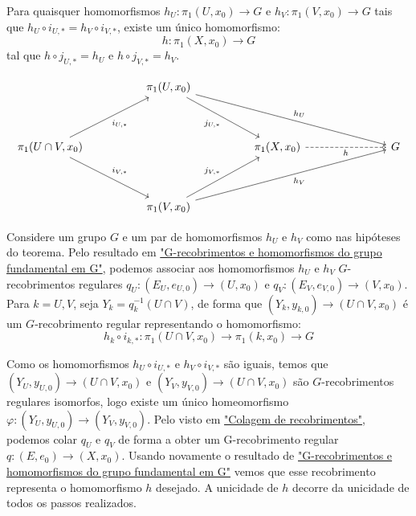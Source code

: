 \begin{thm} 
	Para quaisquer homomorfismos $h_U:\pi_1(U, x_0) \longrightarrow G$ e $h_V:\pi_1(V, x_0) \longrightarrow G$ tais que $h_U \circ i_{U, *} = h_V \circ i_{V, *}$, existe um único homomorfismo: $$h:\pi_1(X, x_0) \longrightarrow G$$ tal que $h \circ j_{U, *} = h_U$ e $h \circ j_{V, *} = h_V$.
\end{thm}

\[\begin{tikzcd}
	&& {\pi_1(U, x_0)} \\
	\\
	{\pi_1(U \cap V, x_0)} &&&& {\pi_1(X, x_0)} &&& G \\
	\\
	&& {\pi_1(V, x_0)}
	\arrow["{j_{U, *}}"', from=1-3, to=3-5]
	\arrow["{h_U}", from=1-3, to=3-8]
	\arrow["{i_{U, *}}"', from=3-1, to=1-3]
	\arrow["{i_{V, *}}", from=3-1, to=5-3]
	\arrow["h"', dashed, from=3-5, to=3-8]
	\arrow["{j_{V, *}}", from=5-3, to=3-5]
	\arrow["{h_V}"', from=5-3, to=3-8]
\end{tikzcd}\]

\begin{dem}
    Considere um grupo $G$ e um par de homomorfismos $h_U$ e $h_V$ como nas hipóteses do teorema. Pelo resultado em \hyperref[homomorfismos-e-g-recobrimentos-prop]{"G-recobrimentos e homomorfismos do grupo fundamental em G"}, podemos associar aos homomorfismos $h_U$ e $h_V$ $G$-recobrimentos regulares $q_U:(E_U,e_{U, 0}) \longrightarrow (U, x_0)$ e $q_V:(E_V,e_{V, 0}) \longrightarrow (V, x_0)$. Para $k = U, V$, seja $Y_k = q_k^{-1}(U \cap V)$, de forma que $(Y_k, y_{k, 0}) \longrightarrow (U \cap V, x_0)$ é um $G$-recobrimento regular representando o homomorfismo: $$h_k \circ i_{k, *}:  \pi_1(U \cap V, x_0) \longrightarrow \pi_1(k, x_0) \longrightarrow G$$

    Como os homomorfismos $h_U \circ i_{U, *}$ e $h_V \circ i_{V, *}$ são iguais, temos que $(Y_U, y_{U, 0}) \longrightarrow (U \cap V, x_0)$ e $(Y_V, y_{V, 0}) \longrightarrow (U \cap V, x_0)$ são $G$-recobrimentos regulares isomorfos, logo existe um único homeomorfismo $\varphi: (Y_U, y_{U, 0}) \longrightarrow (Y_V, y_{V, 0})$. Pelo visto em \hyperref[colagem-de-recobrimentos-prop]{"Colagem de recobrimentos"}, podemos colar $q_U$ e $q_V$ de forma a obter um G-recobrimento regular $q:(E, e_0) \longrightarrow (X, x_0)$. Usando novamente o resultado de \hyperref[homomorfismos-e-g-recobrimentos-prop]{"G-recobrimentos e homomorfismos do grupo fundamental em G"} vemos que esse recobrimento representa o homomorfismo $h$ desejado. A unicidade de $h$ decorre da unicidade de todos os passos realizados.
\end{dem}

